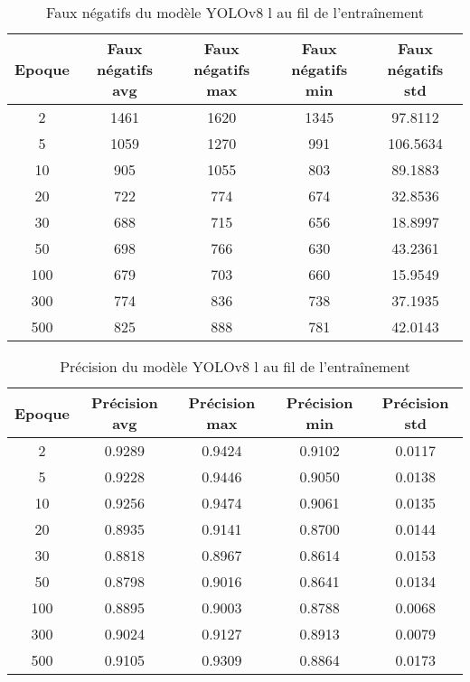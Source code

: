 \begin{table}[!ht]
    \caption{Faux négatifs du modèle YOLOv8 l au fil de l'entraînement}
    \label{tab:yolov8l_false_negative}
    \centering
    \begin{tabular}{ |c||c|c|c|c|  }
        \hline
        \rowcolor{gray!50}
        Epoque & Faux négatifs avg & Faux négatifs max & Faux négatifs min & Faux négatifs std\\
        \hline
        2 & 1461 & 1620 & 1345 & 97.8112\\
        5 & 1059 & 1270 & 991 & 106.5634\\
        10 & 905 & 1055 & 803 & 89.1883\\
        20 & 722 & 774 & 674 & 32.8536\\
        30 & 688 & 715 & 656 & 18.8997\\
        50 & 698 & 766 & 630 & 43.2361\\
        100 & 679 & 703 & 660 & 15.9549\\
        300 & 774 & 836 & 738 & 37.1935\\
        500 & 825 & 888 & 781 & 42.0143\\
        \hline
    \end{tabular}
\end{table}

\begin{table}[!ht]
    \caption{Précision du modèle YOLOv8 l au fil de l'entraînement}
    \label{tab:yolov8l_precision}
    \centering
    \begin{tabular}{ |c||c|c|c|c|  }
        \hline
        \rowcolor{gray!50}
        Epoque & Précision avg & Précision max & Précision min & Précision std\\
        \hline
        2 & 0.9289 & 0.9424 & 0.9102 & 0.0117\\
        5 & 0.9228 & 0.9446 & 0.9050 & 0.0138\\
        10 & 0.9256 & 0.9474 & 0.9061 & 0.0135\\
        20 & 0.8935 & 0.9141 & 0.8700 & 0.0144\\
        30 & 0.8818 & 0.8967 & 0.8614 & 0.0153\\
        50 & 0.8798 & 0.9016 & 0.8641 & 0.0134\\
        100 & 0.8895 & 0.9003 & 0.8788 & 0.0068\\
        300 & 0.9024 & 0.9127 & 0.8913 & 0.0079\\
        500 & 0.9105 & 0.9309 & 0.8864 & 0.0173\\
        \hline
    \end{tabular}
\end{table}

